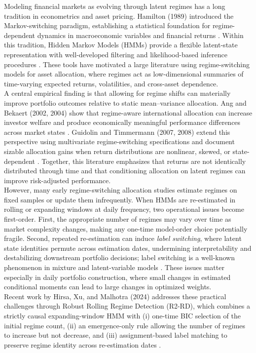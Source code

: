 \documentclass[11pt]{article}
\begin{document}
Modeling financial markets as evolving through latent regimes has a long tradition in econometrics and asset pricing.
Hamilton (1989) introduced the Markov-switching paradigm, establishing a statistical foundation for regime-dependent dynamics in macroeconomic variables and financial returns \cite{Hamilton1989}.
Within this tradition, Hidden Markov Models (HMMs) provide a flexible latent-state representation with well-developed filtering and likelihood-based inference procedures \cite{Rabiner1989,CappeMoulinesRyden2005}.
These tools have motivated a large literature using regime-switching models for asset allocation, where regimes act as low-dimensional summaries of time-varying expected returns, volatilities, and cross-asset dependence.\\
A central empirical finding is that allowing for regime shifts can materially improve portfolio outcomes relative to static mean--variance allocation.
Ang and Bekaert (2002, 2004) show that regime-aware international allocation can increase investor welfare and produce economically meaningful performance differences across market states \cite{AngBekaert2002,AngBekaert2004}.
Guidolin and Timmermann (2007, 2008) extend this perspective using multivariate regime-switching specifications and document sizable allocation gains when return distributions are nonlinear, skewed, or state-dependent \cite{GuidolinTimmermann2007,GuidolinTimmermann2008}.
Together, this literature emphasizes that returns are not identically distributed through time and that conditioning allocation on latent regimes can improve risk-adjusted performance.\\
However, many early regime-switching allocation studies estimate regimes on fixed samples or update them infrequently.
When HMMs are re-estimated in rolling or expanding windows at daily frequency, two operational issues become first-order.
First, the appropriate number of regimes may vary over time as market complexity changes, making any one-time model-order choice potentially fragile.
Second, repeated re-estimation can induce \emph{label switching}, where latent state identities permute across estimation dates, undermining interpretability and destabilizing downstream portfolio decisions; label switching is a well-known phenomenon in mixture and latent-variable models \cite{Stephens2000}.
These issues matter especially in daily portfolio construction, where small changes in estimated conditional moments can lead to large changes in optimized weights.\\
Recent work by Hirsa, Xu, and Malhotra (2024) addresses these practical challenges through Robust Rolling Regime Detection (R2-RD), which combines a strictly causal expanding-window HMM with (i) one-time BIC selection of the initial regime count, (ii) an emergence-only rule allowing the number of regimes to increase but not decrease, and (iii) assignment-based label matching to preserve regime identity across re-estimation dates \cite{Hirsa2024}.
\end{document}
